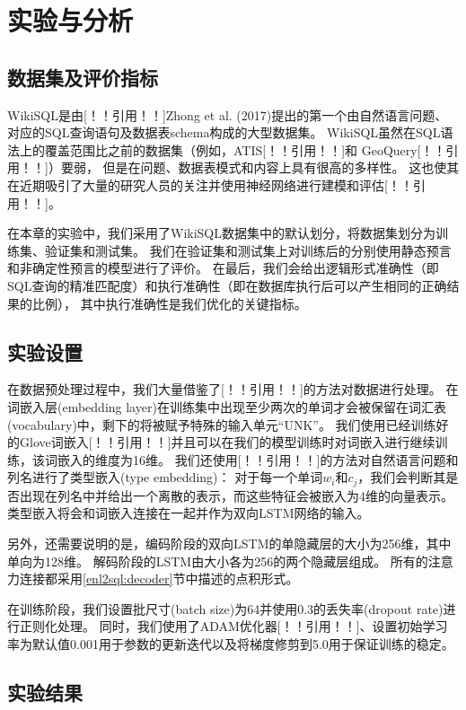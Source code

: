 \section{实验与分析}
\subsection{数据集及评价指标}
WikiSQL是由[！！引用！！]Zhong et al. (2017)提出的第一个由自然语言问题、对应的SQL查询语句及数据表schema构成的大型数据集。
WikiSQL虽然在SQL语法上的覆盖范围比之前的数据集（例如，ATIS[！！引用！！]和 GeoQuery[！！引用！！]）要弱，
但是在问题、数据表模式和内容上具有很高的多样性。
这也使其在近期吸引了大量的研究人员的关注并使用神经网络进行建模和评估[！！引用！！]。

在本章的实验中，我们采用了WikiSQL数据集中的默认划分，将数据集划分为训练集、验证集和测试集。
我们在验证集和测试集上对训练后的分别使用静态预言和非确定性预言的模型进行了评价。
在最后，我们会给出逻辑形式准确性（即SQL查询的精准匹配度）和执行准确性（即在数据库执行后可以产生相同的正确结果的比例），
其中执行准确性是我们优化的关键指标。


\subsection{实验设置}
在数据预处理过程中，我们大量借鉴了[！！引用！！]的方法对数据进行处理。
在词嵌入层(embedding layer)在训练集中出现至少两次的单词才会被保留在词汇表(vocabulary)中，剩下的将被赋予特殊的输入单元“UNK”。
我们使用已经训练好的Glove词嵌入[！！引用！！]并且可以在我们的模型训练时对词嵌入进行继续训练，该词嵌入的维度为16维。
我们还使用[！！引用！！]的方法对自然语言问题和列名进行了类型嵌入(type embedding)：
对于每一个单词$w_i$和$c_j$，我们会判断其是否出现在列名中并给出一个离散的表示，而这些特征会被嵌入为4维的向量表示。
类型嵌入将会和词嵌入连接在一起并作为双向LSTM网络的输入。

另外，还需要说明的是，编码阶段的双向LSTM的单隐藏层的大小为256维，其中单向为128维。
解码阶段的LSTM由大小各为256的两个隐藏层组成。
所有的注意力连接都采用\ref{enl2sql:decoder}节中描述的点积形式。

在训练阶段，我们设置批尺寸(batch size)为64并使用0.3的丢失率(dropout rate)进行正则化处理。
同时，我们使用了ADAM优化器[！！引用！！]、设置初始学习率为默认值0.001用于参数的更新迭代以及将梯度修剪到5.0用于保证训练的稳定。


\subsection{实验结果}
